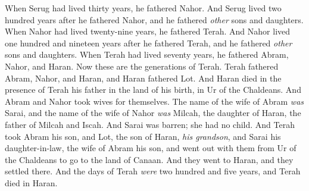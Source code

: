 \begin{biblechapter}
\verse When Serug had lived thirty years, he fathered Nahor.
\verse And Serug lived two hundred years after he fathered Nahor, and he fathered \textit{other} sons and daughters.
\verse When Nahor had lived twenty-nine years, he fathered Terah.
\verse And Nahor lived one hundred and nineteen years after he fathered Terah, and he fathered \textit{other} sons and daughters.
\verse When Terah had lived seventy years, he fathered Abram, Nahor, and Haran.
 Now these are the generations of Terah. Terah fathered Abram, Nahor, and Haran, and Haran fathered Lot.
\verse And Haran died in the presence of Terah his father in the land of his birth, in Ur of the Chaldeans.
\verse And Abram and Nahor took wives for themselves. The name of the wife of Abram \textit{was} Sarai, and the name of the wife of Nahor \textit{was} Milcah, the daughter of Haran, the father of Milcah and Iscah.
\verse And Sarai was barren; she had no child.
\verse And Terah took Abram his son, and Lot, the son of Haran, \textit{his grandson}, and Sarai his daughter-in-law, the wife of Abram his son, and went out with them from Ur of the Chaldeans to go to the land of Canaan. And they went to Haran, and they settled there.
\verse And the days of Terah \textit{were} two hundred and five years, and Terah died in Haran.
\end{biblechapter}

